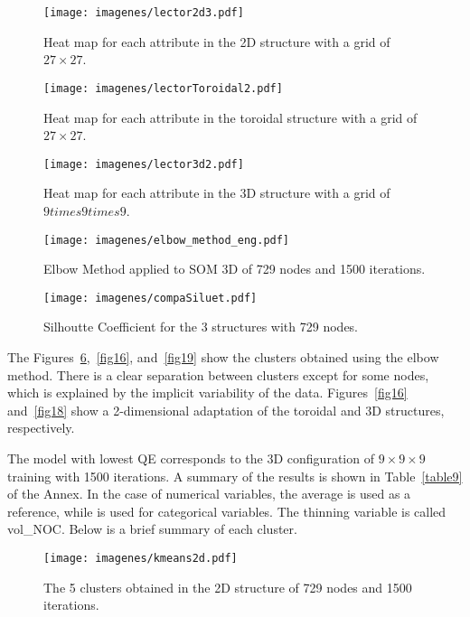 \documentclass[conference]{IEEEtran}
\begin{document}
\begin{figure}[htbp]
\centerline{\texttt{[image: imagenes/lector2d3.pdf]}}
\caption{Heat map for each attribute in the 2D structure with a grid of $27\times27$.}
\label{fig10}
\end{figure}

\begin{figure}[htbp]
\centerline{\texttt{[image: imagenes/lectorToroidal2.pdf]}}
\caption{Heat map for each attribute in the toroidal structure with a grid of $27\times27$.}
\label{fig11}
\end{figure}

\begin{figure}[htbp]
\centerline{\texttt{[image: imagenes/lector3d2.pdf]}}
\caption{Heat map for each attribute in the 3D structure with a grid of $9times9times9$.}
\label{fig12}
\end{figure}

\begin{figure}[htbp]
\centerline{\texttt{[image: imagenes/elbow\_method\_eng.pdf]}}
\caption{Elbow Method applied to SOM 3D of 729 nodes and 1500 iterations.}
\label{fig13}
\end{figure}

\begin{figure}[htbp]
\centerline{\texttt{[image: imagenes/compaSiluet.pdf]}}
\caption{Silhoutte Coefficient for the 3 structures with 729 nodes.}
\label{fig14}
\end{figure}

The Figures~\ref{fig15},~\ref{fig16}, and~\ref{fig19} show the clusters obtained using the elbow method. There is a clear separation between clusters except for some nodes, which is explained by the implicit variability of the data. Figures~\ref{fig16} and~\ref{fig18} show a 2-dimensional adaptation of the toroidal and 3D structures, respectively. 

The model with lowest QE corresponds to the 3D configuration of $9\times9\times9$ training with 1500 iterations. A summary of the results is shown in Table~\ref{table9} of the Annex. In the case of numerical variables, the average is used as a reference, while  is used for categorical variables. The thinning variable is called vol\_NOC. Below is a brief summary of each cluster.

\begin{figure}[htbp]
\centerline{\texttt{[image: imagenes/kmeans2d.pdf]}}
\caption{The 5 clusters obtained in the 2D structure of 729 nodes and 1500 iterations.}
\label{fig15}
\end{figure}
\end{document}
